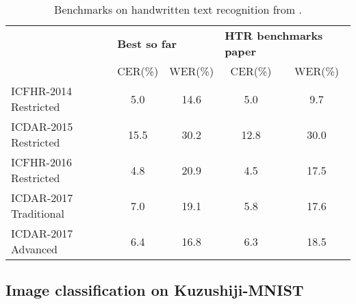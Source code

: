 \begin{table*}[ht!]
	\begin{tabular}{lcccc}
		\rowcolor[HTML]{EFEFEF}
		\cellcolor[HTML]{EFEFEF}                                     & \multicolumn{2}{l}{\cellcolor[HTML]{EFEFEF}\textbf{Best so far}} & \multicolumn{2}{l}{\cellcolor[HTML]{EFEFEF}\textbf{HTR benchmarks paper}} \\
		\rowcolor[HTML]{EFEFEF}
		\multirow{-2}{*}{\cellcolor[HTML]{EFEFEF}\textbf{Benchmark}} & CER(\%)                         & WER(\%)                        & CER(\%)                             & WER(\%)                             \\
		ICFHR-2014 Restricted                                        & 5.0                             & 14.6                           & 5.0                                 & 9.7                                 \\
		ICDAR-2015 Restricted                                        & 15.5                            & 30.2                           & 12.8                                & 30.0                                \\
		ICFHR-2016 Restricted                                        & 4.8                             & 20.9                           & 4.5                                 & 17.5                                \\
		ICDAR-2017 Traditional                                       & 7.0                             & 19.1                           & 5.8                                 & 17.6                                \\
		ICDAR-2017 Advanced                                          & 6.4                             & 16.8                           & 6.3                                 & 18.5
	\end{tabular}
	\caption{Benchmarks on handwritten text recognition from \cite{Sanchez2019-pi}.}
	\label{tab:htr-benchmarks}
\end{table*}

\subsection{Image classification on Kuzushiji-MNIST}
\label{ssec:imagemnist}

